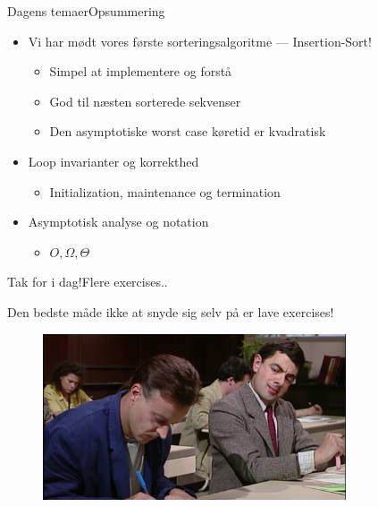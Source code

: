 \documentclass{beamer}
\begin{document}
\begin{frame}{Dagens temaer}{Opsummering}
    \begin{itemize}
        \item Vi har mødt vores første sorteringsalgoritme --- Insertion-Sort!
            \begin{itemize}
                \item Simpel at implementere og forstå
                \item God til næsten sorterede sekvenser
                \item Den asymptotiske worst case køretid er kvadratisk
            \end{itemize}
        \item Loop invarianter og korrekthed
            \begin{itemize}
                \item Initialization, maintenance og termination
            \end{itemize}
        \item Asymptotisk analyse og notation
            \begin{itemize}
                \item $O, \Omega, \Theta$
            \end{itemize}
    \end{itemize}
\end{frame}


\begin{frame}{Tak for i dag!}{Flere exercises..}

    Den bedste måde ikke at snyde sig selv på er lave exercises!

    \begin{figure}[h]
        \centering
        \includegraphics[width=0.8\textwidth]{exercises}
    \end{figure}
    
\end{frame}
\end{document}
